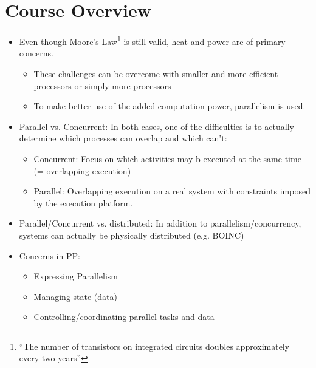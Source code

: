 \documentclass[a4paper]{article}
\begin{document}
\section{Course Overview}
\begin{itemize}
\item Even though Moore's Law\footnote{``The number of transistors on integrated circuits doubles approximately every two years''} is still valid, heat and power are of primary concerns. 
\begin{itemize}
\item These challenges can be overcome with smaller and more efficient processors or simply more processors
\item To make better use of the added computation power, parallelism is used.
\end{itemize}
\item Parallel vs. Concurrent: In both cases, one of the difficulties is to actually determine which processes can overlap and which can't:
\begin{itemize}
\item Concurrent: Focus on which activities may b executed at the same time (= overlapping execution)
\item Parallel: Overlapping execution on a real system with constraints imposed by the execution platform.
\end{itemize}
\item Parallel/Concurrent vs. distributed: In addition to parallelism/concurrency, systems can actually be physically distributed (e.g. BOINC)
\item Concerns in PP:
\begin{itemize}
\item Expressing Parallelism
\item Managing state (data)
\item Controlling/coordinating parallel tasks and data
\end{itemize}
\end{itemize}
\end{document}
